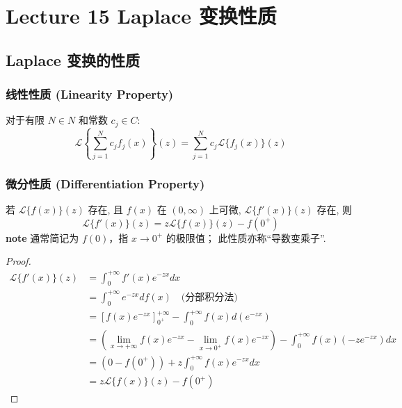 \documentclass[linespread=1.5,openany]{book}%
\def\C{C}%
\def\N{N}%
\def\diff{d}%
\theoremstyle{plain}
\newcommand{\diff}{\mathop{}\!\mathrm{d}}  %
\newcommand{\C}{\mathbb{C}}                %
\newcommand{\N}{\mathbb{N}}                %
\begin{document}
{{				
			}
		
			
			\part{Lecture 15 Laplace 变换性质}
			
			{\chapter{Laplace 变换的性质 }
				{ %
					
					\section{线性性质 (Linearity Property)} %
					{ %
						对于有限 $N \in \N$ 和常数 $c_j \in \C$:
						\begin{equation} \label{eq:15.1.linearity}
							\mathcal{L}\left\{\sum_{j=1}^{N} c_j f_j(x)\right\}(z) = \sum_{j=1}^{N} c_j \mathcal{L}\{f_j(x)\}(z)
						\end{equation}
					} %
					
					\section{微分性质 (Differentiation Property)} %
					{ %
						若 $\mathcal{L}\{f(x)\}(z)$ 存在, 且 $f(x)$ 在 $(0, \infty)$ 上可微, $\mathcal{L}\{f'(x)\}(z)$ 存在, 则
						\begin{equation} \label{eq:15.2.differentiation} %
							\mathcal{L}\{f'(x)\}(z) = z\mathcal{L}\{f(x)\}(z) - f(0^+)
						\end{equation}
						\textbf{note}  
						通常简记为 $f(0)$，指 $x \to 0^+$ 的极限值；
						此性质亦称“导数变乘子”.
						
						\begin{proof}
							\begin{align*}
								\mathcal{L}\{f'(x)\}(z) &= \int_{0}^{+\infty} f'(x) e^{-zx} \diff x \\[6pt]
								&= \int_{0}^{+\infty} e^{-zx} \diff f(x) \quad \text{(分部积分法)} \\[6pt]
								&= \left[ f(x)e^{-zx} \right]_{0^+}^{+\infty} - \int_{0}^{+\infty} f(x) \diff(e^{-zx}) \\[6pt]
								&= \left( \lim_{x\to+\infty} f(x)e^{-zx} - \lim_{x\to 0^+} f(x)e^{-zx} \right) - \int_{0}^{+\infty} f(x) (-z e^{-zx}) \diff x \\[6pt]
								&= (0 - f(0^+)) + z \int_{0}^{+\infty} f(x)e^{-zx} \diff x \\[6pt]
								&= z\mathcal{L}\{f(x)\}(z) - f(0^+)
							\end{align*}
						\end{proof}
					} %
					
}}}
\end{document}
